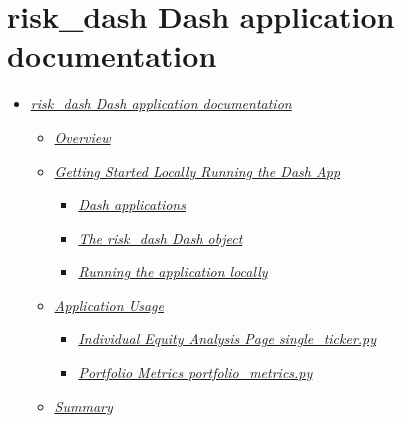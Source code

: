 \documentclass[letterpaper,10pt,english]{sphinxmanual}
\begin{document}
\chapter{risk\_dash Dash application documentation}
\label{\detokenize{dashapp_documentation:risk-dash-dash-application-documentation}}\label{\detokenize{dashapp_documentation:dashapp-documentation}}\label{\detokenize{dashapp_documentation::doc}}\begin{itemize}
\item {} 
\sphinxAtStartPar
{\hyperref[\detokenize{dashapp_documentation:risk_dash-dash-application-documentation}]{\emph{risk\_dash Dash application
documentation}}}
\begin{itemize}
\item {} 
\sphinxAtStartPar
{\hyperref[\detokenize{dashapp_documentation:overview}]{\emph{Overview}}}

\item {} 
\sphinxAtStartPar
{\hyperref[\detokenize{dashapp_documentation:getting-started---locally-running-the-dash-app}]{\emph{Getting Started \sphinxhyphen{} Locally Running the Dash
App}}}
\begin{itemize}
\item {} 
\sphinxAtStartPar
{\hyperref[\detokenize{dashapp_documentation:dash-applications}]{\emph{Dash applications}}}

\item {} 
\sphinxAtStartPar
{\hyperref[\detokenize{dashapp_documentation:the-risk_dash-dash-object}]{\emph{The risk\_dash Dash object}}}

\item {} 
\sphinxAtStartPar
{\hyperref[\detokenize{dashapp_documentation:running-the-application-locally}]{\emph{Running the application
locally}}}

\end{itemize}

\item {} 
\sphinxAtStartPar
{\hyperref[\detokenize{dashapp_documentation:application-usage}]{\emph{Application Usage}}}
\begin{itemize}
\item {} 
\sphinxAtStartPar
{\hyperref[\detokenize{dashapp_documentation:individual-equity-analysis-page---single_tickerpy}]{\emph{Individual Equity Analysis Page \sphinxhyphen{}
single\_ticker.py}}}

\item {} 
\sphinxAtStartPar
{\hyperref[\detokenize{dashapp_documentation:portfolio-metrics---portfolio_metricspy}]{\emph{Portfolio Metrics \sphinxhyphen{}
portfolio\_metrics.py}}}

\end{itemize}

\item {} 
\sphinxAtStartPar
{\hyperref[\detokenize{dashapp_documentation:summary}]{\emph{Summary}}}

\end{itemize}

\end{itemize}
\end{document}
